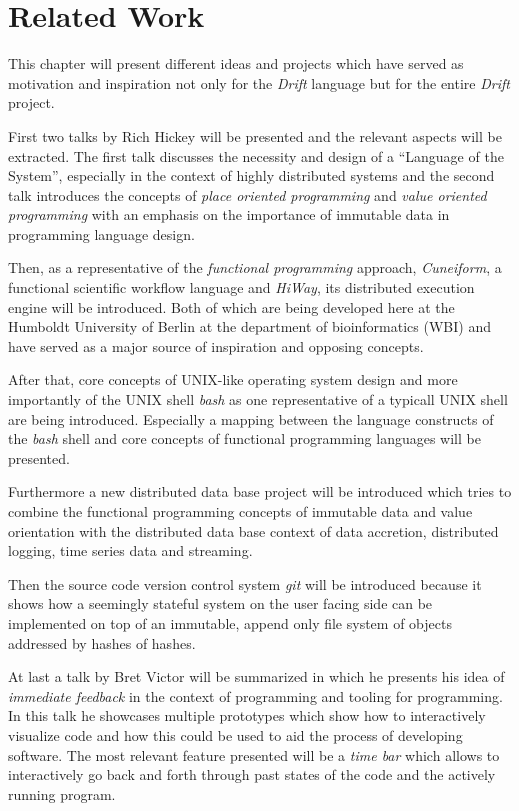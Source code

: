 \section{Related Work}
\label{relatedwork}

This chapter will present different ideas and projects which have
served as motivation and inspiration not only for the \textit{Drift} language
but for the entire \textit{Drift} project.

First two talks by Rich Hickey will be presented and the relevant
aspects will be extracted. The first talk discusses the necessity
and design of a ``Language of the System'', especially in the
context of highly distributed systems and the second talk
introduces the concepts of \textit{place oriented programming}
and \textit{value oriented programming} with an emphasis on
the importance of immutable data in programming language design.

Then, as a representative of the \textit{functional programming}
approach, \textit{Cuneiform}, a functional scientific workflow language
and \textit{HiWay}, its distributed execution engine
will be introduced. Both of which are being developed here at the
Humboldt University of Berlin at the department of bioinformatics (WBI)
and have served as a major source of inspiration and opposing
concepts.

After that, core concepts of UNIX-like operating system design
and more importantly of the UNIX shell \textit{bash} as one representative
of a typicall UNIX shell are being introduced. Especially a
mapping between the language constructs of the \textit{bash} shell
and core concepts of functional programming languages will be
presented.

Furthermore a new distributed data base project will be introduced
which tries to combine the functional programming concepts of
immutable data and value orientation with the distributed data base
context of data accretion, distributed logging, time series data
and streaming.

Then the source code version control system \textit{git} will
be introduced because it shows how a seemingly stateful system
on the user facing side can be implemented on top of an immutable,
append only file system of objects addressed by hashes of hashes.

At last a talk by Bret Victor will be summarized in which he presents
his idea of \textit{immediate feedback} in the context of programming
and tooling for programming. In this talk he showcases multiple
prototypes which show how to interactively visualize code and how
this could be used to aid the process of developing software.
The most relevant feature presented will be a \textit{time bar}
which allows to interactively go back and forth through past
states of the code and the actively running program.


